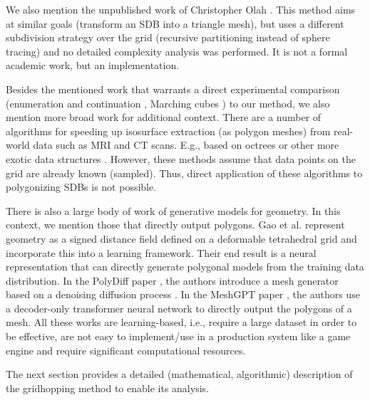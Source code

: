 \documentclass[11pt,twocolumn]{article}
\begin{document}
		We also mention the unpublished work of Christopher Olah \cite{olah2011manipulation,olahImplicitCAD}. This method aims at similar goals (transform an SDB into a triangle mesh), but uses a different subdivision strategy over the grid (recursive partitioning instead of sphere tracing) and no detailed complexity analysis was performed.
        It is not a formal academic work, but an implementation.

        Besides the mentioned work that warrants a direct experimental comparison (enumeration and continuation \cite{bloomenthal}, Marching cubes \cite{LorensenCline87marchingcubes}) to our method, we also mention more broad work for additional context. There are a number of algorithms for speeding up isosurface extraction (as polygon meshes) from real-world data such as MRI and CT scans. E.g., based on octrees \cite{WilhelmsGelder} or other more exotic data structures \cite{CigoniEtAl,LivnatShenJohnson}.
        However, these methods assume that data points on the grid are already known (sampled).
        Thus, direct application of these algorithms to polygonizing SDBs is not possible.

        There is also a large body of work of generative models for geometry.
        In this context, we mention those that directly output polygons. Gao et al. \cite{gao2022get3d} represent geometry as a signed distance field defined on a deformable tetrahedral grid and incorporate this into a learning framework.
        Their end result is a neural representation that can directly generate polygonal models from the training data distribution.
        In the PolyDiff paper \cite{alliegro2023polydiff}, the authors introduce a mesh generator based on a denoising diffusion process \cite{sohldickstein2015deep,ho2020denoising}.
        In the MeshGPT paper \cite{siddiqui2023meshgpt}, the authors use a decoder-only transformer neural network to directly output the polygons of a mesh.
        All these works are learning-based, i.e., require a large dataset in order to be effective, are not easy to implement/use in a production system like a game engine and require significant computational resources.

		The next section provides a detailed (mathematical, algorithmic) description of the gridhopping method to enable its analysis.
\end{document}
